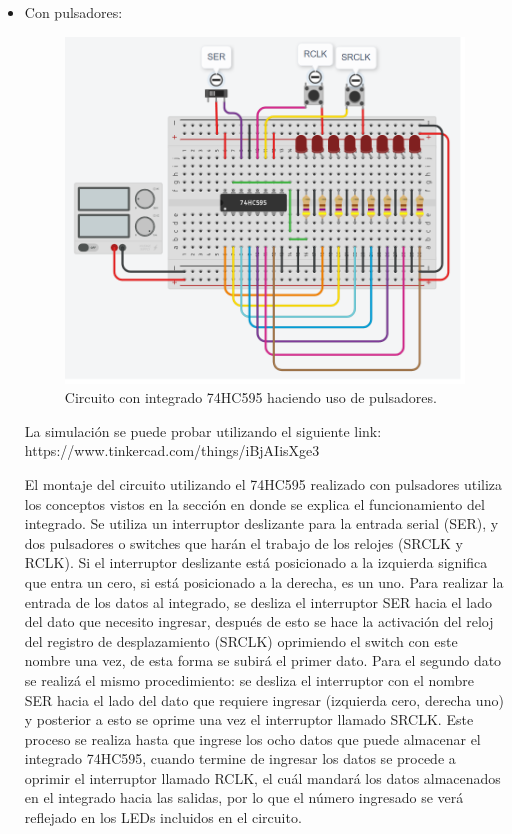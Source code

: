 \documentclass{article}
\begin{document}
\begin{itemize}
\item Con pulsadores: 

\begin{figure}[h]
\includegraphics[scale=0.8]{pulsadores.png}
\centering
\caption{Circuito con integrado 74HC595 haciendo uso de pulsadores.}
\label{fig:pulsadores}
\end{figure}

La simulación se puede probar utilizando el siguiente link: https://www.tinkercad.com/things/iBjAIisXge3

El montaje del circuito utilizando el 74HC595 realizado con pulsadores utiliza los conceptos vistos en la sección en donde se explica el funcionamiento del integrado. 
Se utiliza un interruptor deslizante para la entrada serial (SER), y dos pulsadores o switches que harán el trabajo de los relojes (SRCLK y RCLK). Si el interruptor deslizante está posicionado a la izquierda significa que entra un cero, si está posicionado a la derecha, es un uno. 
Para realizar la entrada de los datos al integrado, se desliza el interruptor SER hacia el lado del dato que necesito ingresar, después de esto se hace la activación del reloj del registro de desplazamiento (SRCLK) oprimiendo el switch con este nombre una vez, de esta forma se subirá el primer dato. Para el segundo dato se realizá el mismo procedimiento: se desliza el interruptor con el nombre SER hacia el lado del dato que requiere ingresar (izquierda cero, derecha uno) y posterior a esto se oprime una vez el interruptor llamado SRCLK. Este proceso se realiza hasta que ingrese los ocho datos que puede almacenar el integrado 74HC595, cuando termine de ingresar los datos se procede a oprimir el interruptor llamado RCLK, el cuál mandará los datos almacenados en el integrado hacia las salidas, por lo que el número ingresado se verá reflejado en los LEDs incluidos en el circuito.



\end{itemize}
\end{document}
